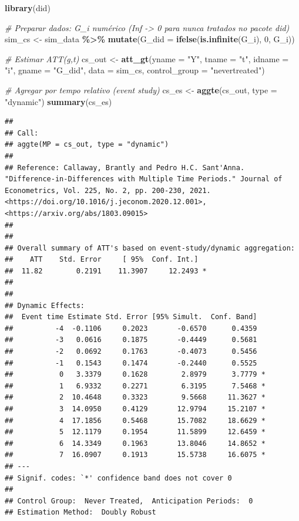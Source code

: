 \documentclass[
]{article}
\newenvironment{Shaded}{\begin{snugshade}}{\end{snugshade}}
\newcommand{\AttributeTok}[1]{\textcolor[rgb]{0.13,0.29,0.53}{#1}}
\newcommand{\CommentTok}[1]{\textcolor[rgb]{0.56,0.35,0.01}{\textit{#1}}}
\newcommand{\DecValTok}[1]{\textcolor[rgb]{0.00,0.00,0.81}{#1}}
\newcommand{\FunctionTok}[1]{\textcolor[rgb]{0.13,0.29,0.53}{\textbf{#1}}}
\newcommand{\NormalTok}[1]{#1}
\newcommand{\OtherTok}[1]{\textcolor[rgb]{0.56,0.35,0.01}{#1}}
\newcommand{\SpecialCharTok}[1]{\textcolor[rgb]{0.81,0.36,0.00}{\textbf{#1}}}
\newcommand{\StringTok}[1]{\textcolor[rgb]{0.31,0.60,0.02}{#1}}
\begin{document}
\begin{Shaded}
\begin{Highlighting}[]
\FunctionTok{library}\NormalTok{(did)}

\CommentTok{\# Preparar dados: G\_i numérico (Inf {-}\textgreater{} 0 para nunca tratados no pacote did)}
\NormalTok{sim\_cs }\OtherTok{\textless{}{-}}\NormalTok{ sim\_data }\SpecialCharTok{\%\textgreater{}\%}
  \FunctionTok{mutate}\NormalTok{(}\AttributeTok{G\_did =} \FunctionTok{ifelse}\NormalTok{(}\FunctionTok{is.infinite}\NormalTok{(G\_i), }\DecValTok{0}\NormalTok{, G\_i))}

\CommentTok{\# Estimar ATT(g,t)}
\NormalTok{cs\_out }\OtherTok{\textless{}{-}} \FunctionTok{att\_gt}\NormalTok{(}\AttributeTok{yname =} \StringTok{"Y"}\NormalTok{,}
                 \AttributeTok{tname =} \StringTok{"t"}\NormalTok{,}
                 \AttributeTok{idname =} \StringTok{"i"}\NormalTok{,}
                 \AttributeTok{gname =} \StringTok{"G\_did"}\NormalTok{,}
                 \AttributeTok{data =}\NormalTok{ sim\_cs,}
                 \AttributeTok{control\_group =} \StringTok{"nevertreated"}\NormalTok{)}

\CommentTok{\# Agregar por tempo relativo (event study)}
\NormalTok{cs\_es }\OtherTok{\textless{}{-}} \FunctionTok{aggte}\NormalTok{(cs\_out, }\AttributeTok{type =} \StringTok{"dynamic"}\NormalTok{)}
\FunctionTok{summary}\NormalTok{(cs\_es)}
\end{Highlighting}
\end{Shaded}

\begin{verbatim}
## 
## Call:
## aggte(MP = cs_out, type = "dynamic")
## 
## Reference: Callaway, Brantly and Pedro H.C. Sant'Anna.  "Difference-in-Differences with Multiple Time Periods." Journal of Econometrics, Vol. 225, No. 2, pp. 200-230, 2021. <https://doi.org/10.1016/j.jeconom.2020.12.001>, <https://arxiv.org/abs/1803.09015> 
## 
## 
## Overall summary of ATT's based on event-study/dynamic aggregation:  
##    ATT    Std. Error     [ 95%  Conf. Int.]  
##  11.82        0.2191    11.3907     12.2493 *
## 
## 
## Dynamic Effects:
##  Event time Estimate Std. Error [95% Simult.  Conf. Band]  
##          -4  -0.1106     0.2023       -0.6570      0.4359  
##          -3   0.0616     0.1875       -0.4449      0.5681  
##          -2   0.0692     0.1763       -0.4073      0.5456  
##          -1   0.1543     0.1474       -0.2440      0.5525  
##           0   3.3379     0.1628        2.8979      3.7779 *
##           1   6.9332     0.2271        6.3195      7.5468 *
##           2  10.4648     0.3323        9.5668     11.3627 *
##           3  14.0950     0.4129       12.9794     15.2107 *
##           4  17.1856     0.5468       15.7082     18.6629 *
##           5  12.1179     0.1954       11.5899     12.6459 *
##           6  14.3349     0.1963       13.8046     14.8652 *
##           7  16.0907     0.1913       15.5738     16.6075 *
## ---
## Signif. codes: `*' confidence band does not cover 0
## 
## Control Group:  Never Treated,  Anticipation Periods:  0
## Estimation Method:  Doubly Robust
\end{verbatim}
\end{document}
